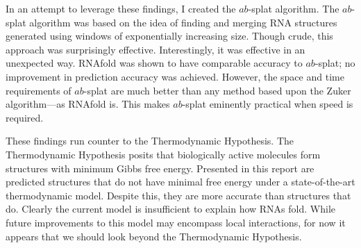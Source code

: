 \documentclass{cshonours}
\begin{document}
In an attempt to leverage these findings, I created the $ab$-splat algorithm. The $ab$-splat algorithm was based on the idea of finding and merging RNA structures generated using windows of exponentially increasing size. Though crude, this approach was surprisingly effective. Interestingly, it was effective in an unexpected way. RNAfold was shown to have comparable accuracy to $ab$-splat; no improvement in prediction accuracy was achieved. However, the space and time requirements of $ab$-splat are much better than any method based upon the Zuker algorithm---as RNAfold is. This makes $ab$-splat eminently practical when speed is required.

These findings run counter to the Thermodynamic Hypothesis. The Thermodynamic Hypothesis posits that biologically active molecules form structures with minimum Gibbs free energy. Presented in this report are predicted structures that do not have minimal free energy under a state-of-the-art thermodynamic model. Despite this, they are more accurate than structures that do. Clearly the current model is insufficient to explain how RNAs fold. While future improvements to this model may encompass local interactions, for now it appears that we should look beyond the Thermodynamic Hypothesis.






\end{document}
